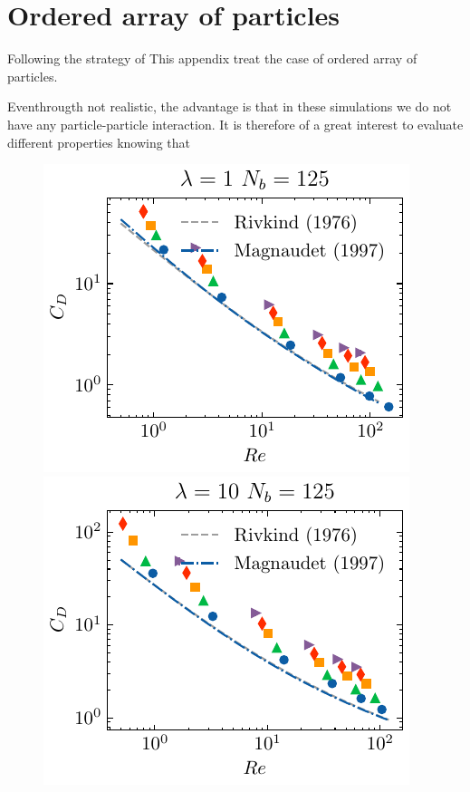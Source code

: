 \section{Ordered array of particles}

Following the strategy of \citet{loisy} This appendix treat the case of ordered array of particles. 

Eventhrougth not realistic, the advantage is that in these simulations we do not have any particle-particle interaction.
It is therefore of a great interest to evaluate different properties knowing that 
\begin{figure}[h!]
    \centering    
    \includegraphics[height = 0.35\textwidth]{image/HOMOGENEOUS/fCA/Cp_N_5_l_1.pdf}
    \includegraphics[height = 0.35\textwidth]{image/HOMOGENEOUS/fCA/Cp_N_5_l_10.pdf}


\end{figure}
